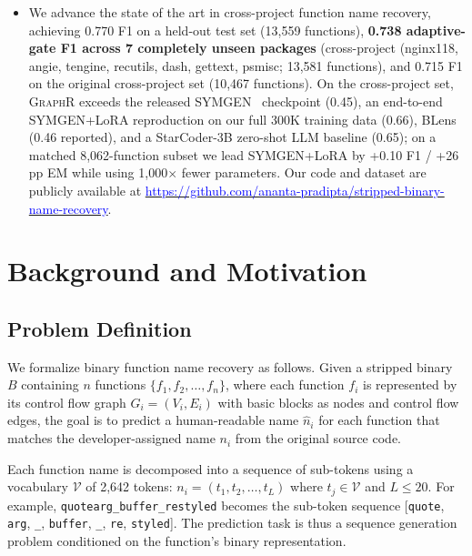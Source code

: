 \documentclass[sigconf,nonacm]{acmart}
\newcommand{\sysname}{\textsc{GraphR}}
\begin{document}
\begin{itemize}
    \item We advance the state of the art in cross-project function name recovery, achieving 0.770 F1 on a held-out test set (13{,}559 functions), \textbf{0.738 adaptive-gate F1 across 7 completely unseen packages} (cross-project (nginx118, angie, tengine, recutils, dash, gettext, psmisc; 13{,}581 functions), and 0.715 F1 on the original cross-project set (10{,}467 functions). On the cross-project set, \sysname{} exceeds the released SYMGEN~\cite{symgen} checkpoint (0.45), an end-to-end SYMGEN+LoRA reproduction on our full 300K training data (0.66), BLens~\cite{blens} (0.46 reported), and a StarCoder-3B zero-shot LLM baseline (0.65); on a matched 8{,}062-function subset we lead SYMGEN+LoRA by +0.10 F1 / +26 pp EM while using 1{,}000$\times$ fewer parameters. Our code and dataset are publicly available at \href{https://github.com/ananta-pradipta/stripped-binary-name-recovery}{\textcolor{blue}{https://github.com/\allowbreak{}ananta-pradipta/\allowbreak{}stripped-binary-name-recovery}}.
\end{itemize}

\section{Background and Motivation}
\label{sec:background}

\subsection{Problem Definition}
\label{sec:problem}

We formalize binary function name recovery as follows. Given a stripped binary $B$ containing $n$ functions $\{f_1, f_2, \ldots, f_n\}$, where each function $f_i$ is represented by its control flow graph $G_i = (V_i, E_i)$ with basic blocks as nodes and control flow edges, the goal is to predict a human-readable name $\hat{n}_i$ for each function that matches the developer-assigned name $n_i$ from the original source code.

Each function name is decomposed into a sequence of sub-tokens using a vocabulary $\mathcal{V}$ of 2,642 tokens: $n_i = (t_1, t_2, \ldots, t_L)$ where $t_j \in \mathcal{V}$ and $L \leq 20$. For example, \texttt{quotearg\_buffer\_restyled} becomes the sub-token sequence [\texttt{quote}, \texttt{arg}, \texttt{\_}, \texttt{buffer}, \texttt{\_}, \texttt{re}, \texttt{styled}]. The prediction task is thus a sequence generation problem conditioned on the function's binary representation.
\end{document}
